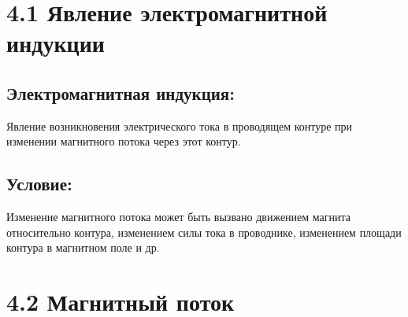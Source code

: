 \documentclass[a4paper,12pt]{article}
\begin{document}
\begin{center}
\end{center}

\vspace{-2.5em}








\section*{4.1 Явление электромагнитной индукции}
\vspace{-9pt}
\subsection*{Электромагнитная индукция:}
\vspace{-3pt}
Явление возникновения электрического тока в проводящем контуре при изменении магнитного потока через этот контур.

\vspace{-9pt}
\subsection*{Условие:}
\vspace{-3pt}
Изменение магнитного потока может быть вызвано движением магнита относительно контура, изменением силы тока в проводнике, изменением площади контура в магнитном поле и др.

\section*{4.2 Магнитный поток}
\vspace{-9pt}
\end{document}
